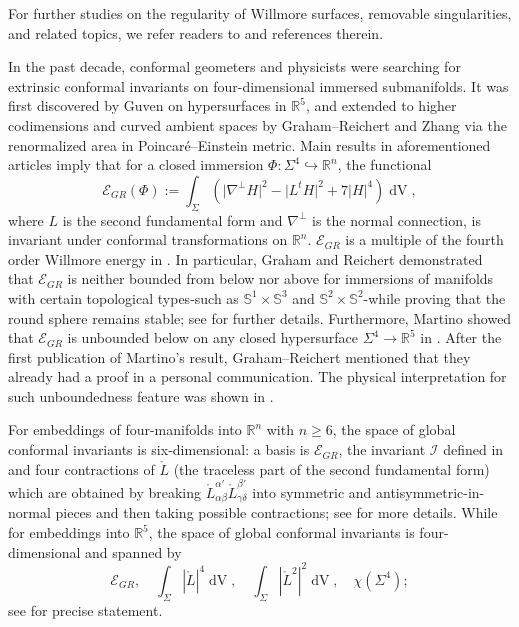 \documentclass[11pt,letterpaper]{amsart}
\DeclareMathOperator{\dvol}{dV}
\newcommand{\mE}{\mathcal{E}}
\newcommand{\bR}{\mathbb{R}}
\theoremstyle{definition}
\theoremstyle{remark}
\numberwithin{equation}{section}
\begin{document}
For further studies on the regularity of Willmore surfaces, removable singularities, and related topics, we refer readers to \cite{Bernard-Riviere14, Kuwert-SchatzleS04, Riviere08, Laurain2016EnergyQO} and references therein.

In the past decade, conformal geometers and physicists were searching for extrinsic conformal invariants on four-dimensional immersed submanifolds. It was first discovered by Guven \cite{Guven05} on hypersurfaces in $\bR^5$, and extended to higher codimensions and curved ambient spaces by Graham--Reichert \cite{Graham-Reichert20} and Zhang \cite{Zhang21} via the renormalized area in Poincar\'{e}--Einstein metric. Main results in aforementioned articles imply that for a closed immersion $\Phi: \Sigma^4 \hookrightarrow \bR^n$, the functional
\begin{equation}
    \mE_{GR}(\Phi):=\int_{\Sigma} \left(\big|\nabla^{\perp}H\big|^2-\big|L^{t}H\big|^2+7|H|^4\right)\dvol,
\end{equation}
where $L$ is the second fundamental form and $\nabla^{\perp}$ is the normal connection, is invariant under conformal transformations on $\bR^n$. $\mE_{GR}$ is a multiple of the fourth order Willmore energy in \cite{Graham-Reichert20, Zhang21}. In particular, Graham and Reichert demonstrated that $\mE_{GR}$ is neither bounded from below nor above for immersions of manifolds with certain topological types-such as 
$\mathbb{S}^1 \times \mathbb{S}^3$ and $\mathbb{S}^2 \times \mathbb{S}^2$-while proving that the round sphere remains stable; see \cite{Graham-Reichert20} for further details. Furthermore, Martino showed that $\mathcal{E}_{GR}$ is unbounded below on any closed hypersurface $\Sigma^4 \to \mathbb{R}^5$ in \cite{Martino23}. After the first publication of Martino's result, Graham–Reichert mentioned that they already had a proof in a personal communication. The physical interpretation for such unboundedness feature was shown in \cite{Anastasiou2025}.

For embeddings of four-manifolds into $\bR^n$ with $n \geq 6$, the space of global conformal invariants is six-dimensional: a basis is $\mE_{GR}$, the invariant $\mathcal{I}$ defined in \cite{CGKTW25} and four contractions of $\mathring{L}$ (the traceless part of the second fundamental form) which are obtained by breaking $\mathring{L}_{\alpha\beta}^{\alpha'}\mathring{L}_{\gamma\delta}^{\beta'}$ into symmetric and antisymmetric-in-normal pieces and then taking possible contractions; see \cite[Section 6]{CGKTW25} for more details. While for embeddings into $\bR^5$, the space of global conformal invariants is four-dimensional and spanned by 
\begin{equation*}
 \mE_{GR},\quad   \int_{\Sigma} |\mathring{L}|^4\dvol,\quad  \int_{\Sigma}|\mathring{L}^2|^2 \dvol, \quad \chi(\Sigma^4);
\end{equation*}
see \cite{Mondino-Nguyen18} for precise statement.
\end{document}
